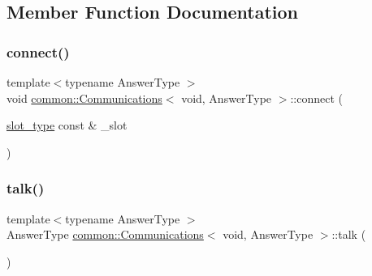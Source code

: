 \subsection{Member Function Documentation}
\mbox{\label{classcommon_1_1Communications_3_01void_00_01AnswerType_01_4_a9af8cbc313e76392f6ba7be39e097be3}} 
\subsubsection{\texorpdfstring{connect()}{connect()}}
{\footnotesize\ttfamily template$<$typename Answer\+Type $>$ \\
void \mbox{\hyperlink{classcommon_1_1Communications}{common\+::\+Communications}}$<$ void, Answer\+Type $>$\+::connect (\begin{DoxyParamCaption}\item[{\mbox{\hyperlink{classcommon_1_1Communications_3_01void_00_01AnswerType_01_4_ae2ac44b26adf6e9b509a91ad4d2c429a}{slot\+\_\+type}} const \&}]{\+\_\+slot }\end{DoxyParamCaption})\hspace{0.3cm}{\ttfamily [inline]}}

\mbox{\label{classcommon_1_1Communications_3_01void_00_01AnswerType_01_4_afbb6280b2f1e9d5805e0cedb055c66df}} 
\subsubsection{\texorpdfstring{talk()}{talk()}}
{\footnotesize\ttfamily template$<$typename Answer\+Type $>$ \\
Answer\+Type \mbox{\hyperlink{classcommon_1_1Communications}{common\+::\+Communications}}$<$ void, Answer\+Type $>$\+::talk (\begin{DoxyParamCaption}{ }\end{DoxyParamCaption})\hspace{0.3cm}{\ttfamily [inline]}}



